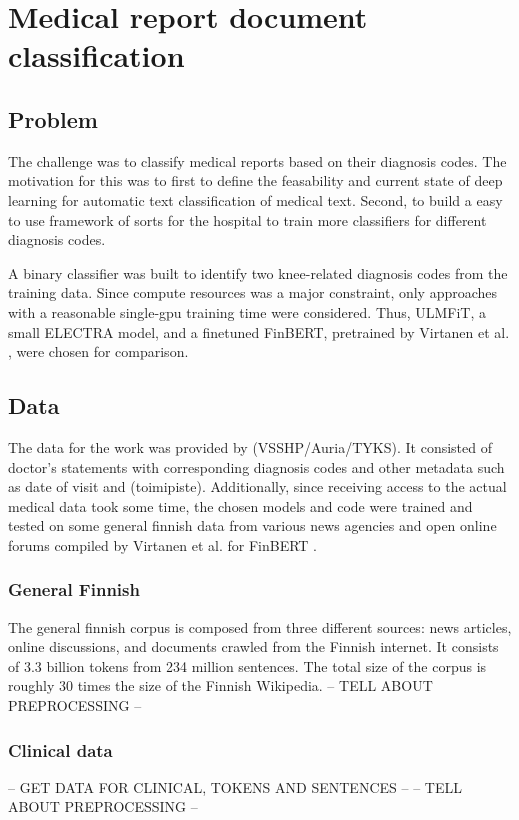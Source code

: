 \chapter{Medical report document classification} \label{Medical report document classification}

\section{Problem} \label{Problem}
The challenge was to classify medical reports based on their diagnosis codes.
The motivation for this was to first to define the feasability and current state of deep learning for automatic text classification of medical text.
Second, to build a easy to use framework of sorts for the hospital to train more classifiers for different diagnosis codes.

A binary classifier was built to identify two knee-related diagnosis codes from the training data.
Since compute resources was a major constraint, only approaches with a reasonable single-gpu training time were considered.
Thus, ULMFiT, a small ELECTRA model, and a finetuned FinBERT, pretrained by Virtanen et al. \cite{virtanen2019}, were chosen for comparison.

\section{Data} \label{Data}
The data for the work was provided by (VSSHP/Auria/TYKS).
It consisted of doctor's statements with corresponding diagnosis codes and other metadata such as date of visit and (toimipiste).
Additionally, since receiving access to the actual medical data took some time, the chosen models and code were trained and tested on some general finnish data from various news agencies and open online forums compiled by Virtanen et al. for FinBERT \cite{virtanen2019}.

\subsection{General Finnish} \label{General Finnish}
The general finnish corpus is composed from three different sources: news articles, online discussions, and documents crawled from the Finnish internet.
It consists of 3.3 billion tokens from 234 million sentences.
The total size of the corpus is roughly 30 times the size of the Finnish Wikipedia.
-- TELL ABOUT PREPROCESSING --

\subsection{Clinical data} \label{Clinical data}
-- GET DATA FOR CLINICAL, TOKENS AND SENTENCES --
-- TELL ABOUT PREPROCESSING --

